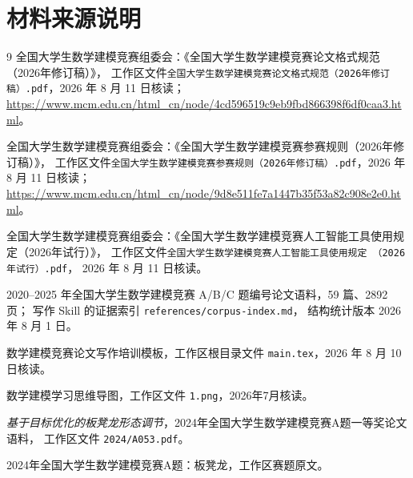 \documentclass[UTF8,zihao=-4]{ctexart}
\begin{document}
\section*{材料来源说明}

\begin{thebibliography}{9}
全国大学生数学建模竞赛组委会：《全国大学生数学建模竞赛论文格式规范（2026年修订稿）》，
工作区文件\texttt{全国大学生数学建模竞赛论文格式规范（2026年修订稿）.pdf}，2026 年 8 月 11 日核读；
\url{https://www.mcm.edu.cn/html_cn/node/4cd596519c9eb9fbd866398f6df0caa3.html}。

全国大学生数学建模竞赛组委会：《全国大学生数学建模竞赛参赛规则（2026年修订稿）》，
工作区文件\texttt{全国大学生数学建模竞赛参赛规则（2026年修订稿）.pdf}，2026 年 8 月 11 日核读；
\url{https://www.mcm.edu.cn/html_cn/node/9d8e511fe7a1447b35f53a82c908e2e0.html}。

全国大学生数学建模竞赛组委会：《全国大学生数学建模竞赛人工智能工具使用规定（2026年试行）》，
工作区文件\texttt{全国大学生数学建模竞赛人工智能工具使用规定 （2026年试行）.pdf}，
2026 年 8 月 11 日核读。

2020--2025 年全国大学生数学建模竞赛 A/B/C 题编号论文语料，59 篇、2892 页；
写作 Skill 的证据索引 \texttt{references/corpus-index.md}，
结构统计版本 2026 年 8 月 1 日。

数学建模竞赛论文写作培训模板，工作区根目录文件 \texttt{main.tex}，2026 年 8 月 10 日核读。

数学建模学习思维导图，工作区文件 \texttt{1.png}，2026年7月核读。

\emph{基于目标优化的板凳龙形态调节}，2024年全国大学生数学建模竞赛A题一等奖论文语料，
工作区文件 \texttt{2024/A053.pdf}。

2024年全国大学生数学建模竞赛A题：板凳龙，工作区赛题原文。
\end{thebibliography}
\end{document}
